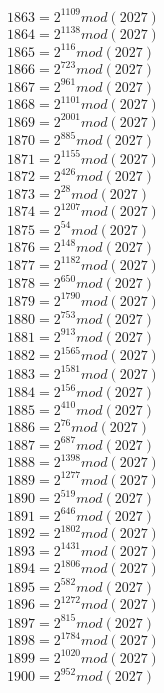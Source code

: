 \documentclass[12pt, letterpaper]{article}
\begin{document}
\begin{itemize}
\begin{multicols}{3}
$1863= 2^{1109} mod (2027)$\\
$1864= 2^{1138} mod (2027)$\\
$1865= 2^{116} mod (2027)$\\
$1866= 2^{723} mod (2027)$\\
$1867= 2^{961} mod (2027)$\\
$1868= 2^{1101} mod (2027)$\\
$1869= 2^{2001} mod (2027)$\\
$1870= 2^{885} mod (2027)$\\
$1871= 2^{1155} mod (2027)$\\
$1872= 2^{426} mod (2027)$\\
$1873= 2^{28} mod (2027)$\\
$1874= 2^{1207} mod (2027)$\\
$1875= 2^{54} mod (2027)$\\
$1876= 2^{148} mod (2027)$\\
$1877= 2^{1182} mod (2027)$\\
$1878= 2^{650} mod (2027)$\\
$1879= 2^{1790} mod (2027)$\\
$1880= 2^{753} mod (2027)$\\
$1881= 2^{913} mod (2027)$\\
$1882= 2^{1565} mod (2027)$\\
$1883= 2^{1581} mod (2027)$\\
$1884= 2^{156} mod (2027)$\\
$1885= 2^{410} mod (2027)$\\
$1886= 2^{76} mod (2027)$\\
$1887= 2^{687} mod (2027)$\\
$1888= 2^{1398} mod (2027)$\\
$1889= 2^{1277} mod (2027)$\\
$1890= 2^{519} mod (2027)$\\
$1891= 2^{646} mod (2027)$\\
$1892= 2^{1802} mod (2027)$\\
$1893= 2^{1431} mod (2027)$\\
$1894= 2^{1806} mod (2027)$\\
$1895= 2^{582} mod (2027)$\\
$1896= 2^{1272} mod (2027)$\\
$1897= 2^{815} mod (2027)$\\
$1898= 2^{1784} mod (2027)$\\
$1899= 2^{1020} mod (2027)$\\
$1900= 2^{952} mod (2027)$\\

\end{multicols}
\end{itemize}
\end{document}
